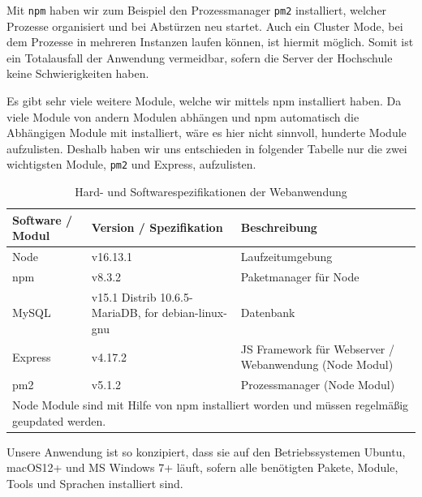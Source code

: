 Mit \verb|npm| haben wir zum Beispiel den Prozessmanager \verb|pm2| installiert, welcher Prozesse organisiert und bei Abstürzen neu startet. Auch ein Cluster Mode, bei dem Prozesse in mehreren Instanzen laufen können, ist hiermit möglich. Somit ist ein Totalausfall der Anwendung vermeidbar, sofern die Server der Hochschule keine Schwierigkeiten haben.

Es gibt sehr viele weitere Module, welche wir mittels npm installiert haben. Da viele Module von andern Modulen abhängen und npm automatisch die Abhängigen Module mit installiert, wäre es hier nicht sinnvoll, hunderte Module aufzulisten. Deshalb haben wir uns entschieden in folgender Tabelle nur die zwei wichtigsten Module, \verb|pm2| und Express, aufzulisten.

\begin{table}[H]
    \caption{Hard- und Softwarespezifikationen der Webanwendung}
    \label{tab:node-specs}
    \setlength{\tabcolsep}{3pt}
    \begin{tabular}{|p{70pt}|p{120pt}|p{180pt}|}
        \hline
        Software / Modul & Version / Spezifikation                            & Beschreibung                                           \\
        \hline\hline
        Node             & v16.13.1                                           & Laufzeitumgebung                                       \\
        \hline
        npm              & v8.3.2                                             & Paketmanager für Node                                  \\
        \hline
        MySQL            & v15.1 Distrib 10.6.5-MariaDB, for debian-linux-gnu & Datenbank                                              \\
        \hline
        Express          & v4.17.2                                            & JS Framework für Webserver / Webanwendung (Node Modul) \\
        \hline
        pm2              & v5.1.2                                             & Prozessmanager (Node Modul)                            \\
        \hline
        \multicolumn{3}{p{400pt}}{Node Module sind mit Hilfe von npm installiert worden und müssen regelmäßig geupdated werden.}
    \end{tabular}
\end{table}

Unsere Anwendung ist so konzipiert, dass sie auf den Betriebssystemen Ubuntu, macOS12+ und MS Windows 7+ läuft, sofern alle benötigten Pakete, Module, Tools und Sprachen installiert sind.\\

